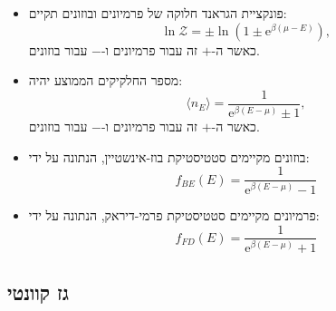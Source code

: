 \documentclass{tstextbook}
\begin{document}
\begin{summary}
  \begin{itemize}
    \item פונקציית הגראנד חלוקה של פרמיונים ובוזונים תקיים:
$$\ln{\mathcal{Z}}=\pm\ln(1\pm\mathrm{e}^{\beta(\mu-E)}),$$
כאשר ה-\(+\) זה עבור פרמיונים ו-\(-\) עבור בוזונים.
    \item מספר החלקיקים הממוצע יהיה:
$$\langle n_{E}\rangle=\frac{1}{\mathrm{e}^{\beta(E-\mu)}\pm1},$$
כאשר ה-\(+\) זה עבור פרמיונים ו-\(-\) עבור בוזונים.
    \item בוזונים מקיימים סטטיסטיקת בוז-אינשטיין, הנתונה על ידי:
$$f_{BE}(E)=\frac{1}{\mathrm{e}^{\beta(E-\mu)}-1}$$
    \item פרמיונים מקיימים סטטיסטיקת פרמי-דיראק, הנתונה על ידי:
$$f_{FD}(E)=\frac{1}{\mathrm{e}^{\beta(E-\mu)}+1}$$
  \end{itemize}
\end{summary}
\subsection{גז קוונטי}
\end{document}
